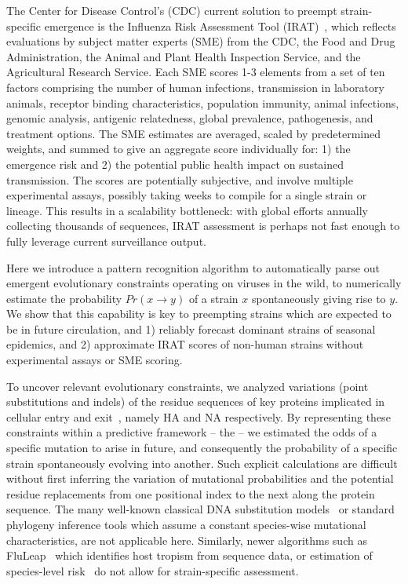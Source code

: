 \documentclass[onecolumn, compsoc,10pt]{IEEEtran}
\begin{document}
The Center for Disease Control's (CDC) current solution to preempt strain-specific emergence  is the Influenza Risk Assessment Tool (IRAT)~\cite{Influenz24:online}, which reflects evaluations by subject matter experts (SME) from the CDC, the Food and Drug Administration, the Animal and Plant Health Inspection Service, and the Agricultural Research Service. Each SME scores 1-3 elements from a set of ten factors comprising the number of  human infections, transmission in laboratory animals, receptor binding characteristics, population immunity, animal infections, genomic analysis, antigenic relatedness, global prevalence,  pathogenesis, and  treatment options. The SME estimates  are averaged, scaled by predetermined weights, and summed to give an aggregate score individually for: 1) the emergence  risk and 2) the potential public health impact on sustained transmission. The scores  are potentially subjective, and  involve multiple experimental assays, possibly taking  weeks to compile for a single strain or lineage. This results in  a scalability bottleneck: with   global  efforts annually  collecting  thousands of sequences, IRAT assessment is perhaps not fast enough to fully leverage  current surveillance output.

Here we introduce a pattern recognition algorithm to automatically parse out emergent evolutionary constraints operating on \infl viruses in the wild, to numerically estimate the probability $Pr(x \rightarrow y)$ of a strain $x$ spontaneously giving rise to  $y$. We show that this capability is key to preempting  strains which are expected to be in future circulation, and  1) reliably forecast dominant strains of seasonal epidemics, and 2) approximate IRAT scores of non-human strains without  experimental assays or SME scoring.

To uncover relevant evolutionary constraints, we analyzed  variations (point substitutions and indels) of the  residue  sequences  of key proteins implicated  in cellular entry and exit~\cite{gamblin2010influenza,shao2017evolution}, namely HA and NA respectively. By representing these constraints within a predictive framework -- the \enet -- we estimated the  odds of a specific mutation to arise in future, and consequently the probability of a specific strain spontaneously  evolving into another.  Such explicit calculations are difficult  without first inferring the variation of mutational probabilities and the potential residue replacements from one positional index to the next along the protein sequence. The many well-known classical  DNA  substitution models~\cite{posada1998modeltest} or standard phylogeny inference tools which assume a constant species-wise mutational characteristics,  are not applicable here. Similarly, newer algorithms such  as FluLeap~\cite{eng2014predicting}  which identifies host tropism from sequence data, or estimation of species-level risk~\cite{grange2021ranking} do not allow for strain-specific assessment.
\end{document}
